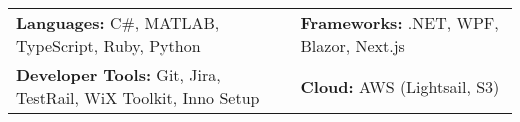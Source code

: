 
\begin{tabular}{p{10.5cm}p{8cm}}
    {\textbf{Languages:} C\#, MATLAB, TypeScript, Ruby, Python} & {\textbf{Frameworks:} .NET, WPF, Blazor, Next.js} \\
    {\textbf{Developer Tools:} Git, Jira, TestRail, WiX Toolkit, Inno Setup} & \textbf{Cloud:} AWS (Lightsail, S3) \\
\end{tabular}